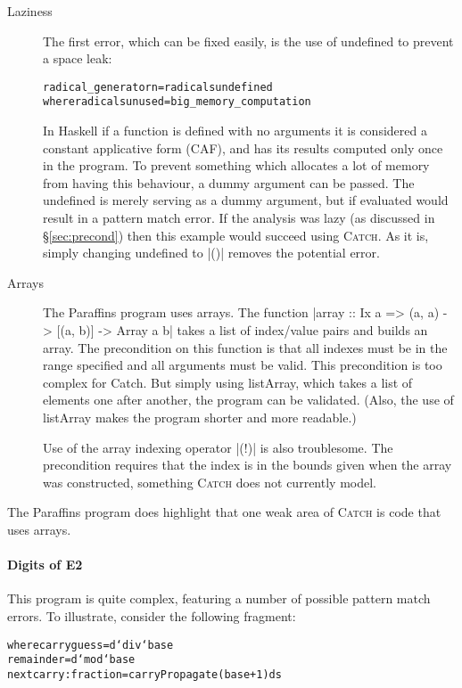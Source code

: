 \documentclass[preprint]{sigplanconf}
\newcommand{\C}[1]{\textsf{#1}}
\newcommand{\catch}{\textsc{Catch}}
\newenvironment{code}{\begin{alltt}\small}{\end{alltt}}
\begin{document}
\begin{description}
\item[Laziness] The first error, which can be fixed easily, is the use of \C{undefined} to prevent a space leak:

    \begin{code}
    radical_generator n = radicals undefined
      where radicals unused = big_memory_computation
    \end{code}

    In Haskell if a function is defined with no arguments it is considered a constant applicative form (CAF), and has its results computed only once in the program. To prevent something which allocates a lot of memory from having this behaviour, a dummy argument can be passed. The \C{undefined} is merely serving as a dummy argument, but if evaluated would result in a pattern match error. If the analysis was lazy (as discussed in \S\ref{sec:precond}) then this example would succeed using \catch{}. As it is, simply changing \C{undefined} to |()| removes the potential error.

\item[Arrays] The Paraffins program uses arrays. The function |array :: Ix a => (a, a) -> [(a, b)] -> Array a b| takes a list of index/value pairs and builds an array. The precondition on this function is that all indexes must be in the range specified and all arguments must be valid. This precondition is too complex for Catch. But simply using \C{listArray}, which takes a list of elements one after another, the program can be validated. (Also, the use of \C{listArray} makes the program shorter and more readable.)

    Use of the array indexing operator |(!)| is also troublesome. The precondition requires that the index is in the bounds given when the array was constructed, something \catch{} does not currently model.
\end{description}

The Paraffins program does highlight that one weak area of \catch{} is code that uses arrays.

\paragraph{Digits of E2}

This program is quite complex, featuring a number of possible pattern match errors. To illustrate, consider the following fragment:

\begin{code}
  where  carryguess = d `div` base
         remainder = d `mod` base
         nextcarry:fraction = carryPropagate (base+1) ds
\end{code}
\end{document}
